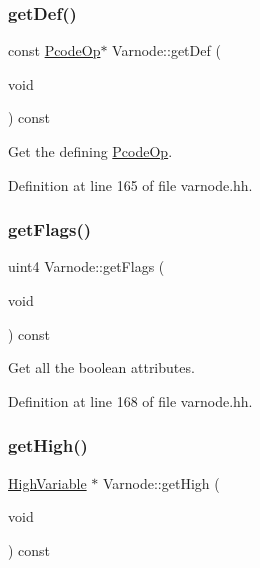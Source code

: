 \subsubsection{\texorpdfstring{getDef()}{getDef()}\hspace{0.1cm}{\footnotesize\ttfamily [2/2]}}
{\footnotesize\ttfamily const \mbox{\hyperlink{class_pcode_op}{Pcode\+Op}}$\ast$ Varnode\+::get\+Def (\begin{DoxyParamCaption}\item[{void}]{ }\end{DoxyParamCaption}) const\hspace{0.3cm}{\ttfamily [inline]}}



Get the defining \mbox{\hyperlink{class_pcode_op}{Pcode\+Op}}. 



Definition at line 165 of file varnode.\+hh.

\mbox{\label{class_varnode_a12481445603bc8b49887c5d6d41e8ae6}} 
\subsubsection{\texorpdfstring{getFlags()}{getFlags()}}
{\footnotesize\ttfamily uint4 Varnode\+::get\+Flags (\begin{DoxyParamCaption}\item[{void}]{ }\end{DoxyParamCaption}) const\hspace{0.3cm}{\ttfamily [inline]}}



Get all the boolean attributes. 



Definition at line 168 of file varnode.\+hh.

\mbox{\label{class_varnode_a99192dea44cf05e3c619f65cbde949c7}} 
\subsubsection{\texorpdfstring{getHigh()}{getHigh()}}
{\footnotesize\ttfamily \mbox{\hyperlink{class_high_variable}{High\+Variable}} $\ast$ Varnode\+::get\+High (\begin{DoxyParamCaption}\item[{void}]{ }\end{DoxyParamCaption}) const}



